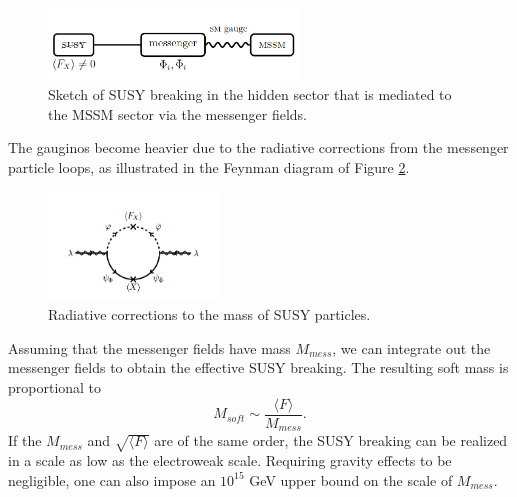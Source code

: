 \documentclass[thesis.tex]{subfiles}
\begin{document}
	\begin{figure}[!htb]
		\centering
		\includegraphics[width=0.6\textwidth]{plot/GMSB.png}
		\caption{Sketch of SUSY breaking in the hidden sector that is mediated to the MSSM sector via the messenger fields.}
		\label{fig:GMSB}
	\end{figure}

The gauginos become heavier due to the radiative corrections from the messenger particle loops, as illustrated in the Feynman diagram of Figure \ref{fig:messanger}. 

\begin{figure}[!htb]
	\centering
		\includegraphics[width=0.4\textwidth]{plot/mess.png}
	\caption{Radiative corrections to the mass of SUSY particles.}
	\label{fig:messanger}
\end{figure}

Assuming that the messenger fields have mass $M_{mess}$, we can integrate out the messenger fields to obtain the effective SUSY breaking. 
The resulting soft mass is proportional to
	\begin{equation}
		M_{soft} \sim \frac{ \langle F \rangle}{M_{mess}}.
	\end{equation}
If the $M_{mess}$ and $\sqrt{\langle F \rangle}$ are of the same order, the SUSY breaking can be realized in a scale as low as the electroweak scale. 
Requiring gravity effects to be negligible, one can also impose an $10^{15}$ GeV upper bound on the scale of $M_{mess}$. 
\end{document}
